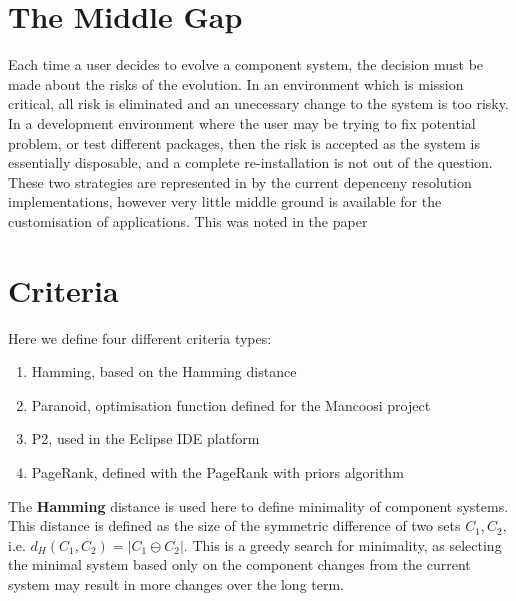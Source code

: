 \section{The Middle Gap}
Each time a user decides to evolve a component system, the decision must be made about the risks of the evolution.
In an environment which is mission critical, all risk is eliminated and an unecessary change to the system is too risky.
In a development environment where the user may be trying to fix potential problem, 
or test different packages, then the risk is accepted as the system is essentially disposable, and a complete re-installation is not out of the question.
These two strategies are represented in by the current depenceny resolution implementations, however very little middle ground is available for the customisation of applications.
This was noted in the paper %

\section{Criteria}
Here we define four different criteria types:
\begin{enumerate}
  \item Hamming, based on the Hamming distance
  \item Paranoid, optimisation function defined for the Mancoosi project
  \item P2, used in the Eclipse IDE platform
  \item PageRank, defined with the PageRank with priors algorithm
\end{enumerate}

The \textbf{Hamming} distance \cite{hamming1950error} is used here to define minimality of component systems.
This distance is defined as the size of the symmetric difference of two sets $C_1,C_2$, 
i.e. $d_H(C_1,C_2) = |C_1 \ominus C_2|$.
This is a greedy search for minimality, 
as selecting the minimal system based only on the component changes from the current system may result in more changes over the long term.

